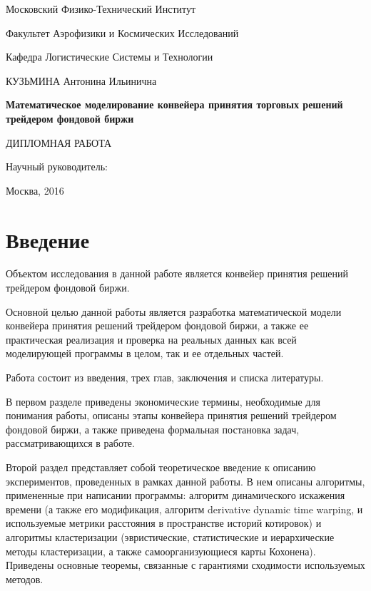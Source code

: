 \documentclass[12pt]{article}
\begin{document}
\thispagestyle{empty}
\begin{center}
\small{Московский Физико-Технический Институт

Факультет Аэрофизики и Космических Исследований

Кафедра Логистические Системы и Технологии}

\parskip=80pt
КУЗЬМИНА Антонина Ильинична
\parskip=30pt

\textbf{\large{Математическое моделирование конвейера принятия торговых решений трейдером фондовой биржи}}

ДИПЛОМНАЯ РАБОТА
\end{center}

\begin{flushright}
\parskip=50pt
Научный руководитель:
\end{flushright}

\vspace{\fill}
\begin{center}
Москва, 2016
\end{center}
\newpage{}
\tableofcontents{}
\newpage{}
\renewcommand\thesection{}
\renewcommand\thesubsection{}
\renewcommand\thesubsubsection{}
\section{Введение}
Объектом исследования в данной работе является конвейер принятия решений трейдером фондовой биржи.

Основной целью данной работы является разработка математической модели конвейера принятия решений трейдером фондовой биржи, а также ее практическая реализация и проверка на реальных данных как всей моделирующей программы в целом, так и ее отдельных частей.

Работа состоит из введения, трех глав, заключения и списка литературы.

В первом разделе приведены экономические термины, необходимые для понимания работы, описаны этапы конвейера принятия решений трейдером фондовой биржи, а также приведена формальная постановка задач, рассматривающихся в работе.

Второй раздел представляет собой теоретическое введение к описанию экспериментов, проведенных в рамках данной работы. В нем описаны алгоритмы, примененные при написании программы: алгоритм динамического искажения времени (а также его модификация, алгоритм derivative dynamic time warping, и используемые метрики расстояния в пространстве историй котировок) и алгоритмы кластеризации (эвристические, статистические и иерархические методы кластеризации, а также самоорганизующиеся карты Кохонена). Приведены основные теоремы, связанные с гарантиями сходимости используемых методов.
\end{document}
